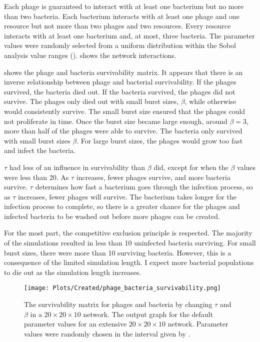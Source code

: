 Each phage is guaranteed to interact with at least one bacterium but no more than two bacteria. 
Each bacterium interacts with at least one phage and one resource but not more than two phages and two resources. 
Every resource interacts with at least one bacterium and, at most, three bacteria. 
The parameter values were randomly selected from a uniform distribution within the Sobol analysis value ranges (). 
 shows the network interactions. 

 shows the phage and bacteria survivability matrix. 
It appears that there is an inverse relationship between phage and bacterial survivability. 
If the phages survived, the bacteria died out. 
If the bacteria survived, the phages did not survive. 
The phages only died out with small burst sizes, $\beta$, while otherwise would consistently survive. The small burst size ensured that the phages could not proliferate in time. 
Once the burst size became large enough, around $\beta = 3$, more than half of the phages were able to survive. 
The bacteria only survived with small burst sizes $\beta$. 
For large burst sizes, the phages would grow too fast and infect the bacteria. 

$\tau$ had less of an influence in survivability than $\beta$ did, except for when the $\beta$ values were less than 20. 
As $\tau$ increases, fewer phages survive, and more bacteria survive. 
$\tau$ determines how fast a bacterium goes through the infection process, so as $\tau$ increases, fewer phages will survive. 
The bacterium takes longer for the infection process to complete, so there is a greater chance for the phages and infected bacteria to be washed out before more phages can be created. 

For the most part, the competitive exclusion principle is respected. 
The majority of the simulations resulted in less than 10 uninfected bacteria surviving. 
For small burst sizes, there were more than 10 surviving bacteria. 
However, this is a consequence of the limited simulation length. 
I expect more bacterial populations to die out as the simulation length increases.

\begin{figure}[]
    \texttt{[image: Plots/Created/phage\_bacteria\_survivability.png]}
    \centering
    \caption{
        The survivability matrix for phages and bacteria by changing $\tau$ and $\beta$ in a $20\times 20\times 10$ network. 
        The output graph for the default parameter values for an extensive $20\times 20 \times 10$ network. 
        Parameter values were randomly chosen in the interval given by . 
    }
    \label{fig:created:survivability}
\end{figure}

